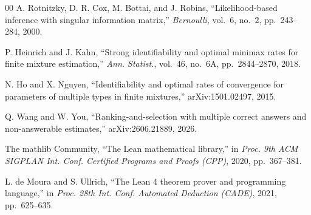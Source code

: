 \begin{thebibliography}{00}
 A. Rotnitzky, D. R. Cox, M. Bottai, and J. Robins, ``Likelihood-based
inference with singular information matrix,'' \emph{Bernoulli}, vol.~6, no.~2, pp.~243--284,
2000.

 P. Heinrich and J. Kahn, ``Strong identifiability and optimal minimax
rates for finite mixture estimation,'' \emph{Ann. Statist.}, vol.~46, no.~6A, pp.~2844--2870,
2018.

 N. Ho and X. Nguyen, ``Identifiability and optimal rates of convergence
for parameters of multiple types in finite mixtures,'' arXiv:1501.02497, 2015.

 Q. Wang and W. You, ``Ranking-and-selection with multiple correct
answers and non-answerable estimates,'' arXiv:2606.21889, 2026.

 The mathlib Community, ``The Lean mathematical library,'' in
\emph{Proc. 9th ACM SIGPLAN Int. Conf. Certified Programs and Proofs (CPP)}, 2020,
pp.~367--381.

 L. de Moura and S. Ullrich, ``The Lean 4 theorem prover and
programming language,'' in \emph{Proc. 28th Int. Conf. Automated Deduction (CADE)}, 2021,
pp.~625--635.

\end{thebibliography}


